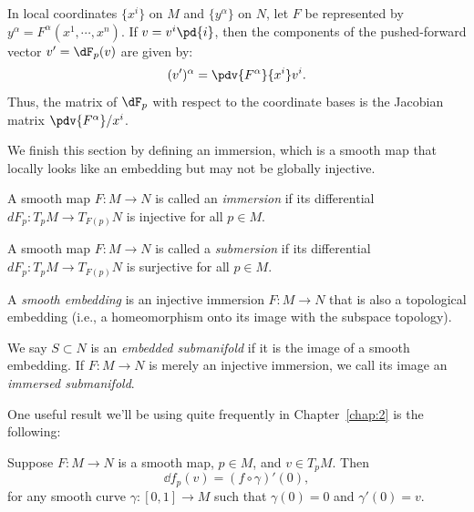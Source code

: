In local coordinates $\{x^i\}$ on $M$ and $\{y^\alpha\}$ on $N$, let $F$ be represented by $y^\alpha = F^\alpha(x^1, \cdots, x^n)$. If $v = v^i\pd{i}$, then the components of the pushed-forward vector $v' = \dF_p(v)$ are given by:
\[%
  (v')^\alpha = \pdv{F^\alpha}{x^i} v^i
.\]%
Thus, the matrix of $\dF_p$ with respect to the coordinate bases is the Jacobian matrix $\pdv{F^\alpha}/{x^i}$.

We finish this section by defining an immersion, which is a smooth map that locally looks like an embedding but may not be globally injective.
\begin{definition}
  A smooth map $F : M \to N$ is called an \emph{immersion} if its differential $dF_p : T_pM \to T_{F(p)}N$ is injective for all $p \in M$.
\end{definition}


\begin{definition}
  A smooth map $F : M \to N$ is called a \emph{submersion} if its differential $dF_p : T_pM \to T_{F(p)}N$ is surjective for all $p \in M$.
\end{definition}


\begin{definition}
  A \emph{smooth embedding} is an injective immersion $F : M \to N$ that is also a topological embedding (i.e., a homeomorphism onto its image with the subspace topology).
\end{definition}


\begin{definition}
  We say $S \subset N$ is an \emph{embedded submanifold} if it is the image of a smooth embedding. If $F: M \to N$ is merely an injective immersion, we call its image an \emph{immersed submanifold}.
\end{definition}


One useful result we'll be using quite frequently in Chapter~\ref{chap:2} is the following:
\begin{corollary}\label{cor:differential_of_a_map}
  Suppose $F : M \to N$ is a smooth map, $p \in M$, and $v \in T_pM$. Then
  \[%
    \dd{f}_p(v) = (f \circ \gamma)'(0)
  ,\]%
  for any smooth curve $\gamma : [0, 1] \to M$ such that $\gamma(0) = 0$ and $\gamma'(0) = v$.
\end{corollary}

